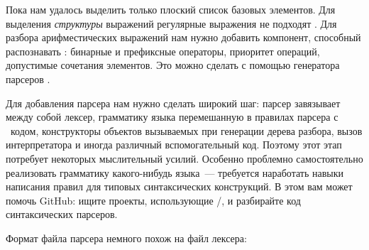 
Пока нам удалось выделить только плоский список базовых элементов. Для выделения
\emph{структуры} выражений регулярные выражения не подходят \cite{dragon}. Для
разбора арифместических выражений нам нужно добавить компонент, способный
распознавать : бинарные и префиксные
операторы, приоритет операций, допустимые сочетания элементов. Это можно сделать
с помощью генератора парсеров .

Для добавления парсера нам нужно сделать широкий шаг: парсер завязывает между
собой лексер, грамматику языка перемешанную в правилах парсера с \cpp\ кодом,
конструкторы объектов вызываемых при генерации дерева разбора, вызов
интерпретатора и иногда различный вспомогательный код. Поэтому этот этап
потребует некоторых мыслительный усилий. Особенно проблемно самостоятельно
реализовать грамматику какого-нибудь языка\ --- требуется наработать навыки
написания правил для типовых синтаксических конструкций. В этом вам может помочь
GitHub: ищите проекты, использующие /, и разбирайте код
синтаксических парсеров.

\clearpage
Формат файла парсера немного похож на файл лексера:


